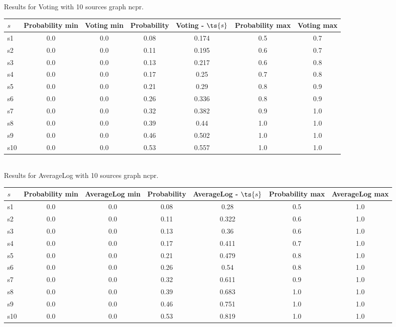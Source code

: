 \documentclass{article}
\begin{document}
\noindent Results for Voting with 10 sources graph ncpr.

\noindent\begin{tabular}{|l|c|c|c|c|c|c|}
\hline
$s$& Probability min & Voting min & Probability & Voting - $\ts{s}$ & Probability max & Voting max\\
\hline
s1 &0.0 & 0.0 & 0.08 & 0.174 & 0.5 & 0.7\\
\hline
s2 &0.0 & 0.0 & 0.11 & 0.195 & 0.6 & 0.7\\
\hline
s3 &0.0 & 0.0 & 0.13 & 0.217 & 0.6 & 0.8\\
\hline
s4 &0.0 & 0.0 & 0.17 & 0.25 & 0.7 & 0.8\\
\hline
s5 &0.0 & 0.0 & 0.21 & 0.29 & 0.8 & 0.9\\
\hline
s6 &0.0 & 0.0 & 0.26 & 0.336 & 0.8 & 0.9\\
\hline
s7 &0.0 & 0.0 & 0.32 & 0.382 & 0.9 & 1.0\\
\hline
s8 &0.0 & 0.0 & 0.39 & 0.44 & 1.0 & 1.0\\
\hline
s9 &0.0 & 0.0 & 0.46 & 0.502 & 1.0 & 1.0\\
\hline
s10 &0.0 & 0.0 & 0.53 & 0.557 & 1.0 & 1.0\\
\hline
\end{tabular}\\

\noindent Results for AverageLog with 10 sources graph ncpr.

\noindent\begin{tabular}{|l|c|c|c|c|c|c|}
\hline
$s$& Probability min & AverageLog min & Probability & AverageLog - $\ts{s}$ & Probability max & AverageLog max\\
\hline
s1 &0.0 & 0.0 & 0.08 & 0.28 & 0.5 & 1.0\\
\hline
s2 &0.0 & 0.0 & 0.11 & 0.322 & 0.6 & 1.0\\
\hline
s3 &0.0 & 0.0 & 0.13 & 0.36 & 0.6 & 1.0\\
\hline
s4 &0.0 & 0.0 & 0.17 & 0.411 & 0.7 & 1.0\\
\hline
s5 &0.0 & 0.0 & 0.21 & 0.479 & 0.8 & 1.0\\
\hline
s6 &0.0 & 0.0 & 0.26 & 0.54 & 0.8 & 1.0\\
\hline
s7 &0.0 & 0.0 & 0.32 & 0.611 & 0.9 & 1.0\\
\hline
s8 &0.0 & 0.0 & 0.39 & 0.683 & 1.0 & 1.0\\
\hline
s9 &0.0 & 0.0 & 0.46 & 0.751 & 1.0 & 1.0\\
\hline
s10 &0.0 & 0.0 & 0.53 & 0.819 & 1.0 & 1.0\\
\hline
\end{tabular}\\
\end{document}
